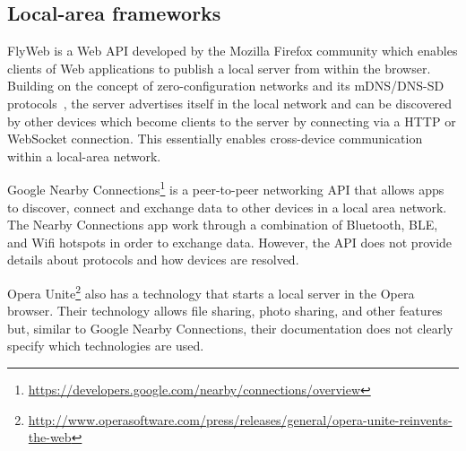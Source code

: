 \subsection{Local-area frameworks}
\label{sec:flyweb}

FlyWeb is a Web API developed by the Mozilla Firefox community which enables clients of Web applications to publish a local server from within the browser. Building on the concept of zero-configuration networks and its mDNS/DNS-SD protocols~\cite{rfc6762, rfc6763}, the server advertises itself in the local network and can be discovered by other devices which become clients to the server by connecting via a HTTP or WebSocket connection. This essentially enables cross-device communication within a local-area network.

Google Nearby Connections\footnote{\url{https://developers.google.com/nearby/connections/overview}} is a peer-to-peer networking API that allows apps to discover, connect and exchange data to other devices in a local area network. The Nearby Connections app work through a combination of Bluetooth, BLE, and Wifi hotspots in order to exchange data. However, the API does not provide details about protocols and how devices are resolved.

Opera Unite\footnote{\url{http://www.operasoftware.com/press/releases/general/opera-unite-reinvents-the-web}} also has a technology that starts a local server in the Opera browser. Their technology allows file sharing, photo sharing, and other features but, similar to Google Nearby Connections, their documentation does not clearly specify which technologies are used.